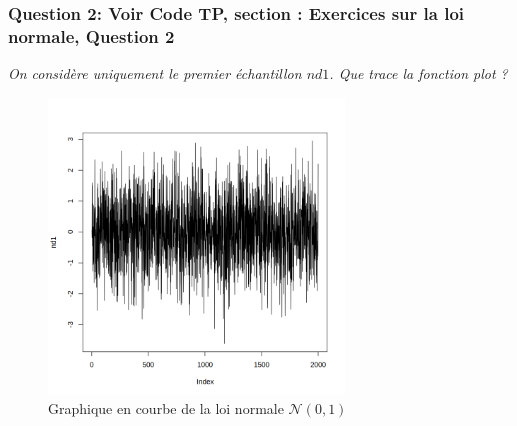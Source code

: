         \subsubsection{Question 2: Voir Code TP, section : Exercices sur la loi normale, Question 2 \cite{TP}}
              \begin{center}
                \textit{On considère uniquement le premier échantillon $nd1$. Que trace la fonction plot ?}
              \end{center}
              \begin{table}[H]
                \centering
                \begin{minipage}{0.28\textwidth}
                    \centering
                    \begin{figure}[H]
                        \centering
                        \includegraphics[width=0.7\textwidth]{4_attachments/figures/output21.png}
                        \caption{Graphique en courbe de la loi normale $\mathcal N(0,1)$}
                        \label{fig:fig1}
                    \end{figure}
                

\end{minipage}
\end{table}
